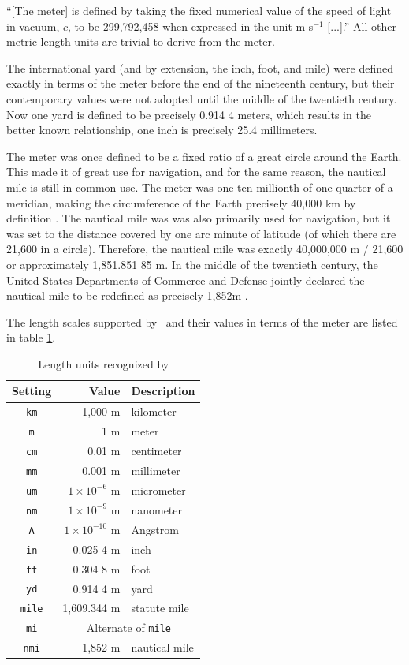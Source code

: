 ``[The meter] is defined by taking the fixed numerical value of the speed of light in vacuum, $c$, to be 299,792,458 when expressed in the unit m s$^{-1}$ [...].''\cite[p.131]{si:2019} All other metric length units are trivial to derive from the meter.

The international yard (and by extension, the inch, foot, and mile) were defined exactly in terms of the meter before the end of the nineteenth century, but their contemporary values were not adopted until the middle of the twentieth century.\cite{nbs:sp447}  Now one yard is defined to be precisely 0.914 4 meters, which results in the better known relationship, one inch is precisely 25.4 millimeters.

The meter was once defined to be a fixed ratio of a great circle around the Earth.  This made it of great use for navigation, and for the same reason, the nautical mile is still in common use.  The meter was one ten millionth of one quarter of a meridian, making the circumference of the Earth precisely 40,000 km by definition \cite{nbs:sp447}.  The nautical mile was was also primarily used for navigation, but it was set to the distance covered by one arc minute of latitude (of which there are 21,600 in a circle).  Therefore, the nautical mile was exactly 40,000,000 m / 21,600 or approximately 1,851.851 85 m.  In the middle of the twentieth century, the United States Departments of Commerce and Defense jointly declared the nautical mile to be redefined as precisely 1,852m \cite{nbs:1959}.

The length scales supported by \PM\ and their values in terms of the meter are listed in table \ref{tab:length}.

\begin{table}
\centering
\caption{Length units recognized by \PM}\label{tab:length}
\begin{tabular}{crl}
\hline
Setting & Value & Description\\
\hline
\verb|km| & 1,000 m & kilometer\\
\verb|m| & 1 m & meter\\
\verb|cm| & 0.01 m & centimeter\\
\verb|mm| & 0.001 m & millimeter\\
\verb|um| & $1\times 10^{-6}$ m & micrometer\\
\verb|nm| & $1\times 10^{-9}$ m & nanometer\\
\verb|A| &  $1\times 10^{-10}$ m & Angstrom\\
\verb|in| & 0.025 4 m & inch\\
\verb|ft| & 0.304 8 m & foot\\
\verb|yd| & 0.914 4 m & yard\\
\verb|mile| & 1,609.344 m & statute mile\\
\verb|mi| & \multicolumn{2}{c}{Alternate of \texttt{mile}}\\
\verb|nmi| & 1,852 m & nautical mile\\
\hline
\end{tabular}
\end{table}

